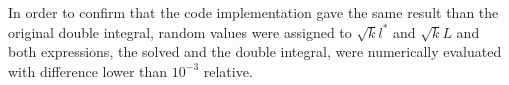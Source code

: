In order to confirm that the code implementation gave the same result than the original double integral, random values were assigned to $\sqrt{k}l^*$ and $\sqrt{k}L$ and both expressions, the solved and the double integral, were numerically evaluated with difference lower than $10^{-3}$ relative.\par